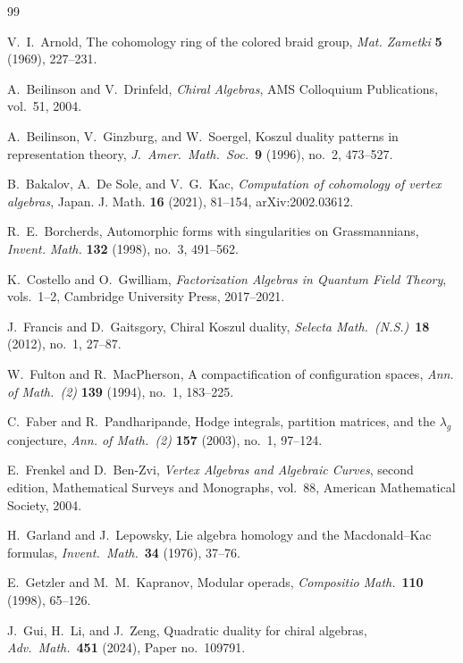 \documentclass[11pt]{article}
\theoremstyle{plain}
\theoremstyle{definition}
\theoremstyle{remark}
\begin{document}
\begin{thebibliography}{99}

V.~I.~Arnold,
The cohomology ring of the colored braid group,
\emph{Mat. Zametki} \textbf{5} (1969), 227--231.

A.~Beilinson and V.~Drinfeld,
\emph{Chiral Algebras},
AMS Colloquium Publications, vol.~51, 2004.

A.~Beilinson, V.~Ginzburg, and W.~Soergel,
Koszul duality patterns in representation theory,
\emph{J.\ Amer.\ Math.\ Soc.}\ \textbf{9} (1996), no.~2, 473--527.

B.~Bakalov, A.~De Sole, and V.~G.~Kac,
\emph{Computation of cohomology of vertex algebras},
Japan. J. Math. \textbf{16} (2021), 81--154,
arXiv:2002.03612.

R.~E.~Borcherds,
Automorphic forms with singularities on Grassmannians,
\emph{Invent. Math.} \textbf{132} (1998), no.~3, 491--562.

K.~Costello and O.~Gwilliam,
\emph{Factorization Algebras in Quantum Field Theory}, vols.~1--2,
Cambridge University Press, 2017--2021.

J.~Francis and D.~Gaitsgory,
Chiral Koszul duality,
\emph{Selecta Math.\ (N.S.)}\ \textbf{18} (2012), no.~1, 27--87.

W.~Fulton and R.~MacPherson,
A compactification of configuration spaces,
\emph{Ann. of Math.\ (2)} \textbf{139} (1994), no.~1, 183--225.

C.~Faber and R.~Pandharipande,
Hodge integrals, partition matrices, and the $\lambda_g$ conjecture,
\emph{Ann. of Math.\ (2)} \textbf{157} (2003), no.~1, 97--124.

E.~Frenkel and D.~Ben-Zvi,
\emph{Vertex Algebras and Algebraic Curves},
second edition, Mathematical Surveys and Monographs, vol.~88,
American Mathematical Society, 2004.

H.~Garland and J.~Lepowsky,
Lie algebra homology and the Macdonald--Kac formulas,
\emph{Invent.\ Math.}\ \textbf{34} (1976), 37--76.

E.~Getzler and M.~M.~Kapranov,
Modular operads,
\emph{Compositio Math.}\ \textbf{110} (1998), 65--126.

J.~Gui, H.~Li, and J.~Zeng,
Quadratic duality for chiral algebras,
\emph{Adv.\ Math.}\ \textbf{451} (2024), Paper no.~109791.


\end{thebibliography}
\end{document}
